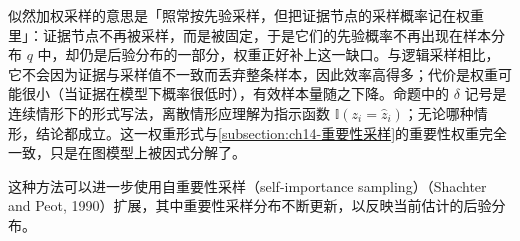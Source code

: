\documentclass[../../main.tex]{subfiles}
\begin{document}
\begin{remark}似然加权采样的意思是「照常按先验采样，但把证据节点的采样概率记在权重里」：证据节点不再被采样，而是被固定，于是它们的先验概率不再出现在样本分布 $q$ 中，却仍是后验分布的一部分，权重正好补上这一缺口。与逻辑采样相比，它不会因为证据与采样值不一致而丢弃整条样本，因此效率高得多；代价是权重可能很小（当证据在模型下概率很低时），有效样本量随之下降。命题中的 $\delta$ 记号是连续情形下的形式写法，离散情形应理解为指示函数 $\mathbb{I}\left(z_{i}=\hat{z}_{i}\right)$；无论哪种情形，结论都成立。这一权重形式与\cref{subsection:ch14-重要性采样}的重要性权重完全一致，只是在图模型上被因式分解了。
\end{remark}

这种方法可以进一步使用自重要性采样（self-importance sampling）（Shachter and Peot, 1990）扩展，其中重要性采样分布不断更新，以反映当前估计的后验分布。
\end{document}
